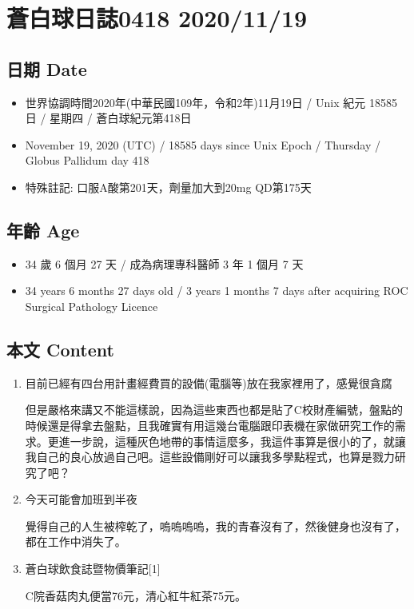 \documentclass[a5paper, 11pt
]{book}
\providecommand{\tightlist}{%
  \setlength{\itemsep}{0pt}\setlength{\parskip}{0pt}}
\begin{document}
\hypertarget{ux84bcux767dux7403ux65e5ux8a8c0418-20201119}{%
\section{蒼白球日誌0418
2020/11/19}\label{ux84bcux767dux7403ux65e5ux8a8c0418-20201119}}

\hypertarget{ux65e5ux671f-date-72}{%
\subsection{日期 Date}\label{ux65e5ux671f-date-72}}

\begin{itemize}
\tightlist
\item
  世界協調時間2020年(中華民國109年，令和2年)11月19日 / Unix 紀元 18585
  日 / 星期四 / 蒼白球紀元第418日
\item
  November 19, 2020 (UTC) / 18585 days since Unix Epoch / Thursday /
  Globus Pallidum day 418
\item
  特殊註記: 口服A酸第201天，劑量加大到20mg QD第175天
\end{itemize}

\hypertarget{ux5e74ux9f61-age-72}{%
\subsection{年齡 Age}\label{ux5e74ux9f61-age-72}}

\begin{itemize}
\tightlist
\item
  34 歲 6 個月 27 天 / 成為病理專科醫師 3 年 1 個月 7 天
\item
  34 years 6 months 27 days old / 3 years 1 months 7 days after
  acquiring ROC Surgical Pathology Licence
\end{itemize}

\hypertarget{ux672cux6587-content-72}{%
\subsection{本文 Content}\label{ux672cux6587-content-72}}

\begin{enumerate}
\def\labelenumi{\arabic{enumi}.}
\item
  目前已經有四台用計畫經費買的設備(電腦等)放在我家裡用了，感覺很貪腐

  但是嚴格來講又不能這樣說，因為這些東西也都是貼了C校財產編號，盤點的時候還是得拿去盤點，且我確實有用這幾台電腦跟印表機在家做研究工作的需求。更進一步說，這種灰色地帶的事情這麼多，我這件事算是很小的了，就讓我自己的良心放過自己吧。這些設備剛好可以讓我多學點程式，也算是戮力研究了吧？
\item
  今天可能會加班到半夜

  覺得自己的人生被榨乾了，嗚嗚嗚嗚，我的青春沒有了，然後健身也沒有了，都在工作中消失了。
\item
  蒼白球飲食誌暨物價筆記{[}1{]}

  C院香菇肉丸便當76元，清心紅牛紅茶75元。
\end{enumerate}
\end{document}
